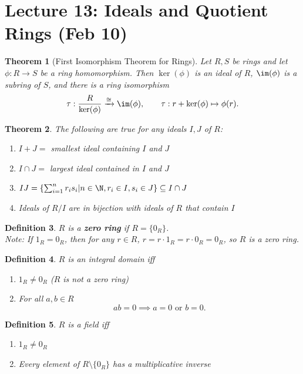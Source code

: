 \documentclass[a4paper,12pt]{article}
\newtheorem{thm}{Theorem}[section]
\newtheorem{defn}[thm]{Definition}
\begin{document}
\section{Lecture 13: Ideals and Quotient Rings (Feb 10)}
\begin{thm}[First Isomorphism Theorem for Rings]
    Let $R,S$ be rings and let $\phi:R\to S$ be a ring homomorphism. Then $\ker(\phi)$ is an ideal of $R$, $\im(\phi)$ is a subring of $S$, and there is a ring isomorphism
    \[
    \tau: \frac{R}{\ker(\phi)}\xrightarrow{\cong} \im(\phi), \qquad \tau:r+\ker(\phi)\mapsto \phi(r).
    \]
\end{thm}
\begin{thm}
    The following are true for any ideals $I,J$ of $R$:
    \begin{enumerate}
        \item $I+J=$ smallest ideal containing $I$ and $J$
        \item $I\cap J=$ largest ideal contained in $I$ and $J$
        \item $IJ= \left\{\sum_{i=1}^nr_i s_i | n\in \N, r_i\in I, s_i\in J\right\}\subseteq I\cap J$ 
        \item Ideals of $R/I$ are in bijection with ideals of $R$ that contain $I$ 
    \end{enumerate}
\end{thm}
\begin{defn}
    $R$ is a \textbf{zero ring} if $R=\{0_R\}$.\\
    Note: If $1_R=0_R$, then for any $r\in R$, $r=r\cdot 1_R=r\cdot 0_R=0_R$, so $R$ is a zero ring.
\end{defn}
\begin{defn}
    $R$ is an integral domain iff 
        \begin{enumerate}
            \item $1_R\neq 0_R$ ($R$ is not a zero ring)
            \item For all $a,b\in R$ \[
            ab=0 \implies a=0 \text{ or } b=0
            .\] 
        \end{enumerate}
\end{defn}
\begin{defn}
    $R$ is a field iff \begin{enumerate}
        \item $1_R\neq 0_R$
        \item Every element of $R\setminus \{0_R\}$ has a multiplicative inverse
    \end{enumerate}
\end{defn}
\end{document}
